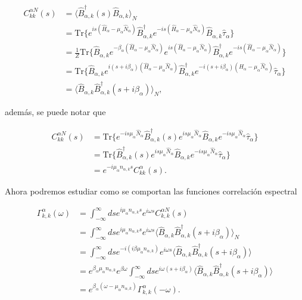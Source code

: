 \begin{appendixs}
\begin{align*}
    C^{\alpha N}_{kk}(s) & =  \langle \hat{B}^{\dagger}_{\alpha,k}(s)\hat{B}_{\alpha,k} \rangle_{N} \\
   &  = \text{Tr}\{e^{is(\hat{H}_{\alpha} - \mu_{\alpha}\hat{N}_{\alpha})}\hat{B}^{\dagger}_{\alpha,k}e^{-is(\hat{H}_{\alpha} - \mu_{\alpha}\hat{N}_{\alpha})}\hat{B}_{\alpha,k}\hat{\tau}_{\alpha}  \} \\
   & = \frac{1}{Z}\text{Tr}\{\hat{B}_{\alpha,k} e^{-\beta_{\alpha}(\hat{H}_{\alpha} - \mu_{\alpha}\hat{N}_{\alpha})} e^{is(\hat{H}_{\alpha} - \mu_{\alpha}\hat{N}_{\alpha})}\hat{B}^{\dagger}_{\alpha,k}e^{-is(\hat{H}_{\alpha} - \mu_{\alpha}\hat{N}_{\alpha})}\} \\
   & = \text{Tr}\{\hat{B}_{\alpha,k}e^{i(s+i\beta_{\alpha})(\hat{H}_{\alpha} - \mu_{\alpha}\hat{N}_{\alpha})}\hat{B}^{\dagger}_{\alpha,k}e^{-i(s+i\beta_{\alpha})(\hat{H}_{\alpha} - \mu_{\alpha}\hat{N}_{\alpha})}\hat{\tau}_{\alpha} \} \\
   & = \langle \hat{B}_{\alpha,k} \hat{B}^{\dagger}_{\alpha,k}(s+i\beta_{\alpha})\rangle_{N},
\end{align*}

además, se puede notar que

\begin{align*}
    C^{\alpha N}_{kk}(s) & = \text{Tr}\{e^{-is\mu_{\alpha}\hat{N}_{\alpha} }\hat{B}^{\dagger}_{\alpha,k}(s)e^{is\mu_{\alpha}\hat{N}_{\alpha}} \hat{B}_{\alpha,k}e^{-is\mu_{\alpha}\hat{N}_{\alpha} }\hat{\tau}_{\alpha}   \} \\
 & = \text{Tr}\{\hat{B}^{\dagger}_{\alpha,k}(s)e^{is\mu_{\alpha}\hat{N}_{\alpha}} \hat{B}_{\alpha,k}e^{-is\mu_{\alpha}\hat{N}_{\alpha}}\hat{\tau}_{\alpha}   \}\\
 & = e^{-i\mu_{\alpha}n_{\alpha,k}s} C^{\alpha}_{kk}(s).
\end{align*}

Ahora podremos estudiar como se comportan las funciones correlación espectral

\begin{align*}
    \Gamma^{\alpha}_{k,k}(\omega) & = \int_{-\infty}^{\infty}ds e^{i\mu_{\alpha}n_{\alpha,k}s} e^{i\omega s}C^{\alpha N}_{k,k}(s) \\
    & = \int_{-\infty}^{\infty}ds e^{i\mu_{\alpha}n_{\alpha,k}s} e^{i\omega s}\langle \hat{B}_{\alpha,k} \hat{B}^{\dagger}_{\alpha,k}(s+i\beta_{\alpha}) \rangle_{N} \\
    & = \int_{-\infty}^{\infty}ds e^{-i(i\beta \mu_{\alpha}n_{\alpha,k})} e^{i\omega s} \langle \hat{B}_{\alpha,k}\hat{B}^{\dagger}_{\alpha,k}(s+i\beta_{\alpha}) \rangle \\
    & = e^{\beta_{\alpha}\mu_{\alpha}n_{\alpha,k}}e^{\beta \omega} \int_{-\infty}^{\infty} ds e^{i\omega(s+i\beta_{\alpha})} \langle \hat{B}_{\alpha,k}\hat{B}^{\dagger}_{\alpha,k}(s+i\beta_{\alpha}) \rangle \\
    & = e^{\beta_{\alpha}(\omega - \mu_{\alpha}n_{\alpha,k})} \Gamma^{\alpha}_{k,k}(-\omega).
\end{align*}



\end{appendixs}
